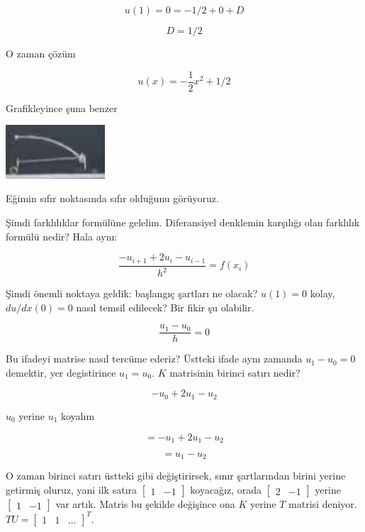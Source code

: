 \documentclass[12pt,fleqn]{article}\usepackage{../../common}
\begin{document}
$$ u(1) = 0 = -1/2 + 0 + D  $$

$$ D = 1/2  $$

O zaman çözüm

$$ u(x) = -\frac{1}{2}x^2  + 1/2$$

Grafikleyince şuna benzer

\includegraphics[height=2cm]{2_4.png}

Eğimin sıfır noktasında sıfır olduğunu görüyoruz.

Şimdi farklılıklar formülüne gelelim. Diferansiyel denklemin karşılığı olan
farklılık formülü nedir? Hala aynı:

$$ \frac{-u_{i+1}+2u_i - u_{i-1}}{h^2} = f(x_i)$$

Şimdi önemli noktaya geldik: başlangıç şartları ne olacak? $u(1)=0$ kolay,
$ du/dx(0) = 0$ nasıl temsil edilecek? Bir fikir şu olabilir. 

$$ \frac{u_1-u_0}{h} = 0 $$

Bu ifadeyi matrise nasıl tercüme ederiz? Üstteki ifade aynı zamanda $u_1 -
u_0 = 0$ demektir, yer degistirince $u_1 = u_0$. $K$ matrisinin birinci
satırı nedir?

$$ -u_0 + 2u_1 - u_2 $$

$u_0$ yerine $u_1$ koyalım

$$ = -u_1 + 2u_1 - u_2 $$

$$ = u_1 - u_2 $$

O zaman birinci satırı üstteki gibi değiştirirsek, sınır şartlarından
birini yerine getirmiş oluruz, yani ilk satıra
$\left[\begin{array}{cc} 1&-1\end{array}\right]$ koyacağız, orada
$\left[\begin{array}{cc} 2&-1\end{array}\right]$ yerine
$\left[\begin{array}{cc} 1&-1\end{array}\right]$ var artık. Matris bu
şekilde değişince ona $K$ yerine $T$ matrisi deniyor.
$TU = \left[\begin{array}{ccc} 1&1&\dots\end{array}\right]^T$.
\end{document}
